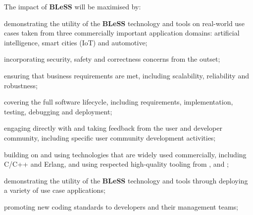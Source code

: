 \documentclass[a4paper,11pt]{article}
\newcommand{\project}[1]{\textbf{#1}\xspace}
\newcommand{\BLESS}{\project{BLeSS}}
\newcommand{\TheProject}{\BLESS}
\begin{document}
The impact of \TheProject{} will be maximised by:
\begin{inparaenum}[i)]
\item
demonstrating the utility of the \TheProject{} technology and tools on real-world use cases taken
from three commercially important application domains: artificial intelligence, smart cities (IoT) and automotive;
\item
incorporating security, safety and correctness concerns from the outset;
\item
ensuring that business requirements are met, including scalability, reliability and robustness;
\item
covering the full software lifecycle, including requirements, implementation, testing, debugging and deployment;
\item
engaging directly with and taking feedback from the user and developer community, including specific user community development
activities;
\item
building on and using technologies that are widely used commercially, including C/C++ and Erlang, and using respected high-quality tooling
from \IBMshort{}, \PRLshort{} and \CODEPLAYshort{};
\item
demonstrating the utility of the \TheProject{} technology and tools through deploying a variety of 
use case applications;
\item
promoting new coding standards to developers and their management teams;

\end{inparaenum}
\end{document}
